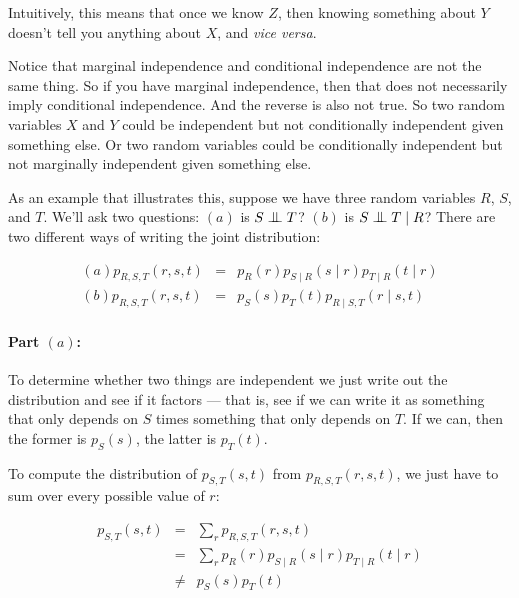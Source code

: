 \documentclass[6008notes.tex]{subfiles}
\begin{document}
Intuitively, this means that once we know $Z$, then knowing something about $Y$ doesn't tell you anything about $X$, and \textit{vice versa}. 

Notice that marginal independence and conditional independence are not the same thing. So if you have marginal independence, then that does not necessarily imply conditional independence. And the reverse is also not true. So two random variables $X$ and $Y$ could be independent but not conditionally independent given something else. Or two random variables could be conditionally independent but not marginally independent given something else. 

As an example that illustrates this, suppose we have three random variables $R$, $S$, and $T$. We'll ask two questions: $(a)$ is $S \bigCI T$? $(b)$ is $S \bigCI T \mid R$? There are two different ways of writing the joint distribution:

\begin{eqnarray*}
(a) p_{R,S,T}(r,s,t) &=& p_R(r) p_{S \mid R}(s \mid r)  p_{T \mid R}(t \mid r) \\
(b) p_{R,S,T}(r,s,t) &=& p_S(s) p_T(t) p_{R \mid S,T}(r \mid s,t) 
\end{eqnarray*}


\paragraph{Part $(a)$:} To determine whether two things are independent we just write out the distribution and see if it factors --- that is, see if we can write it as something that only depends on $S$ times something that only depends on $T$. If we can, then the former is $p_S(s)$, the latter is $p_T(t)$. 

To compute the distribution of $p_{S,T}(s,t)$ from $p_{R,S,T}(r,s,t)$, we just have to sum over every possible value of $r$:

\begin{eqnarray*}
p_{S,T}(s,t) &=& \sum_r p_{R,S,T}(r,s,t) \\
             &=& \sum_r p_R(r) p_{S \mid R}(s \mid r)  p_{T \mid R}(t \mid r) \\
						 &\neq& p_S(s) p_T(t)
\end{eqnarray*}
\end{document}
